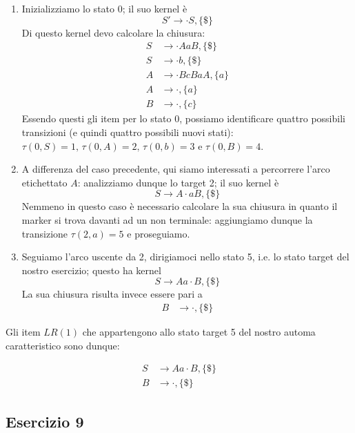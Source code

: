 \documentclass[class=book, crop=false, oneside, 12pt]{standalone}
\begin{document}
\begin{enumerate}
    \item Inizializziamo lo stato 0; il suo kernel è 
    \begin{equation*}
        S' \to \cdot S, \{\$\}
    \end{equation*}
    Di questo kernel devo calcolare la chiusura:
    \begin{align*}
        S &\to \cdot AaB, \{\$\} \\
        S &\to \cdot b, \{\$\} \\
        A &\to \cdot BcBaA, \{a\} \\
        A &\to \cdot, \{a\} \\
        B &\to \cdot, \{c\}
    \end{align*}
    Essendo questi gli item per lo stato 0, possiamo identificare quattro possibili transizioni (e quindi quattro possibili nuovi stati): \(\tau(0,S)=1 \textrm{, } \tau(0,A)=2 \textrm{, } \tau(0,b)=3 \textrm{ e } \tau(0,B)=4\).
    \item A differenza del caso precedente, qui siamo interessati a percorrere l'arco etichettato \(A\): analizziamo dunque lo target 2; il suo kernel è 
    \begin{equation*}
        S \to  A \cdot aB, \{\$\}
    \end{equation*}
    Nemmeno in questo caso è necessario calcolare la sua chiusura in quanto il marker si trova davanti ad un non terminale: aggiungiamo dunque la transizione \(\tau(2,a)=5 \) e proseguiamo.
    \item Seguiamo l'arco uscente da 2, dirigiamoci nello stato 5, i.e. lo stato target del nostro esercizio; questo ha kernel
    \begin{equation*}
        S \to  Aa \cdot B, \{\$\}
    \end{equation*}
    La sua chiusura risulta invece essere pari a 
    \begin{align*}
        B &\to \cdot, \{\$\}
    \end{align*}
\end{enumerate}

Gli item \(LR(1)\) che appartengono allo stato target 5 del nostro automa caratteristico sono dunque:

\begin{align*}
     S &\to  Aa \cdot B, \{\$\} \\
     B &\to \cdot, \{\$\}
\end{align*}

\subsection{Esercizio 9}
\end{document}
